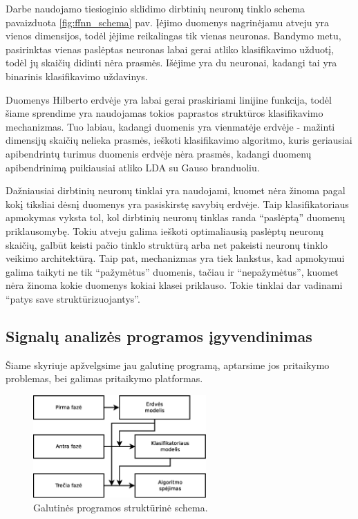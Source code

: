 \documentclass[]{vgtuef}
\begin{document}
Darbe naudojamo tiesioginio sklidimo dirbtinių neuronų tinklo schema
pavaizduota \ref{fig:ffnn_schema} pav. Įėjimo duomenys nagrinėjamu
atveju yra vienos dimensijos, todėl įėjime reikalingas tik vienas
neuronas. Bandymo metu, pasirinktas vienas paslėptas neuronas labai
gerai atliko klasifikavimo užduotį, todėl jų skaičių didinti nėra
prasmės. Išėjime yra du neuronai, kadangi tai yra binarinis
klasifikavimo uždavinys.

Duomenys Hilberto erdvėje yra labai gerai praskiriami linijine
funkcija, todėl šiame sprendime yra naudojamas tokios paprastos
struktūros klasifikavimo mechanizmas. Tuo labiau, kadangi duomenis yra
vienmatėje erdvėje - mažinti dimensijų skaičių nelieka prasmės,
ieškoti klasifikavimo algoritmo, kuris geriausiai apibendrintų turimus
duomenis erdvėje nėra prasmės, kadangi duomenų apibendrinimą
puikiausiai atliko LDA su Gauso branduoliu.

Dažniausiai dirbtinių neuronų tinklai yra naudojami, kuomet nėra
žinoma pagal kokį tiksliai dėsnį duomenys yra pasiskirstę savybių
erdvėje. Taip klasifikatoriaus apmokymas vyksta tol, kol dirbtinių
neuronų tinklas randa ``paslėptą'' duomenų priklausomybę. Tokiu atveju
galima ieškoti optimaliausią paslėptų neuronų skaičių, galbūt keisti
pačio tinklo struktūrą arba net pakeisti neuronų tinklo veikimo
architektūrą. Taip pat, mechanizmas yra tiek lankstus, kad apmokymui
galima taikyti ne tik ``pažymėtus'' duomenis, tačiau ir
``nepažymėtus'', kuomet nėra žinoma kokie duomenys kokiai klasei
priklauso. Tokie tinklai dar vadinami ``patys save struktūrizuojantys''.

\subsection{Signalų analizės programos įgyvendinimas}
\label{subsec:total_program}

Šiame skyriuje apžvelgsime jau galutinę programą, aptarsime jos
pritaikymo problemas, bei galimas pritaikymo platformas.

\begin{figure}[!t]
  \centering
  \includegraphics[width=250px]{figures/galutine_programa.eps}
  \caption{Galutinės programos struktūrinė schema.}
  \label{fig:galutine_programa}
\end{figure}
\end{document}

